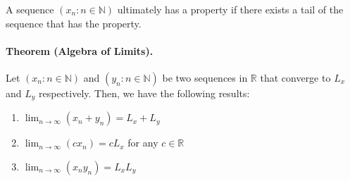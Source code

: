 \documentclass[openany]{book}
\numberwithin{equation}{section}
\begin{document}
    A sequence $(x_n : n \in \mathbb{N})$ ultimately has a property if there exists a tail of the sequence that has the property.
\par
\paragraph{Theorem (Algebra of Limits).}

    Let $(x_n : n \in \mathbb{N})$ and $(y_n : n \in \mathbb{N})$ be two sequences in $\mathbb{R}$ that converge to $L_x$ and $L_y$ respectively. Then, we have the following results:
    \begin{enumerate}
        \item $\lim_{n \to \infty} (x_n + y_n) = L_x + L_y$
        \item $\lim_{n \to \infty} (cx_n) = c L_x$ for any $c \in \mathbb{R}$
        \item $\lim_{n \to \infty} (x_n y_n) = L_x L_y$
    \end{enumerate}
\par
\end{document}

